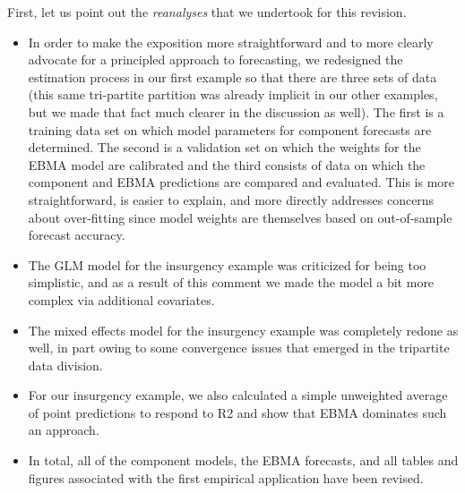 \documentclass[10pt]{article}
\begin{document}
First, let us point out the \textit{reanalyses} that we undertook for this revision.  
\begin{itemize} 
\item In order to make the exposition more straightforward and to more clearly advocate for a principled approach to forecasting, we redesigned the estimation process in our first example so that there are three sets of data (this same tri-partite partition was already implicit in our other examples, but we made that fact much clearer in the discussion as well).  The first is a training data set on which model parameters for component forecasts are determined. The second is a validation set on which the weights for the EBMA model are calibrated and the third consists of data on which the component and EBMA predictions are compared and evaluated.  This is more straightforward, is easier to explain, and more directly addresses concerns about over-fitting since model weights are themselves based on out-of-sample forecast accuracy.  
\item The GLM model for the insurgency example was criticized for being too simplistic, and as a result of this comment we made the model a bit more complex via additional covariates.  
\item The mixed effects model for the insurgency example was completely redone as well, in part owing to some convergence issues that emerged in the tripartite data division.  
\item For our insurgency example, we also calculated a simple unweighted average of point predictions to respond to R2 and show that EBMA dominates such an approach.  
\item In total, all of the component models, the EBMA forecasts, and all tables and figures associated with the first empirical application have been revised.
\end{itemize}
\end{document}
